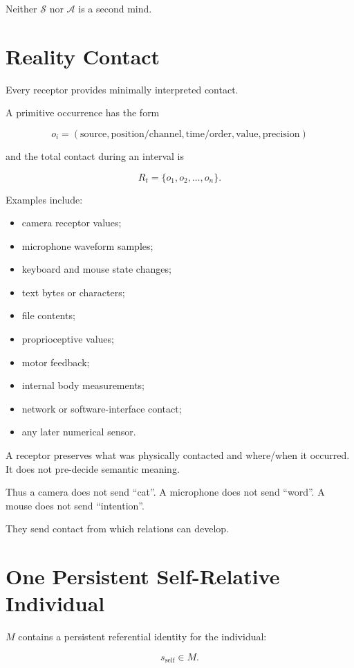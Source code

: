 \documentclass[11pt]{article}
\newcommand{\Sx}{\mathcal{S}}
\newcommand{\Ax}{\mathcal{A}}
\begin{document}
Neither $\Sx$ nor $\Ax$ is a second mind.

\section{Reality Contact}

Every receptor provides minimally interpreted contact.

A primitive occurrence has the form

\[
o_i=
(\text{source},
 \text{position/channel},
 \text{time/order},
 \text{value},
 \text{precision})
\]

and the total contact during an interval is

\[
R_t=\{o_1,o_2,\ldots,o_n\}.
\]

Examples include:

\begin{itemize}[leftmargin=2em]
    \item camera receptor values;
    \item microphone waveform samples;
    \item keyboard and mouse state changes;
    \item text bytes or characters;
    \item file contents;
    \item proprioceptive values;
    \item motor feedback;
    \item internal body measurements;
    \item network or software-interface contact;
    \item any later numerical sensor.
\end{itemize}

A receptor preserves what was physically contacted and where/when it occurred.
It does not pre-decide semantic meaning.

Thus a camera does not send ``cat''.
A microphone does not send ``word''.
A mouse does not send ``intention''.

They send contact from which relations can develop.

\section{One Persistent Self-Relative Individual}

$M$ contains a persistent referential identity for the individual:

\[
s_{\text{self}}\in M.
\]
\end{document}

